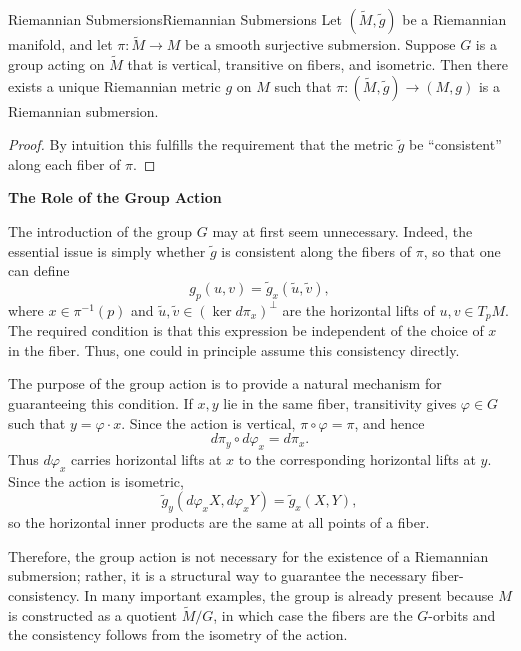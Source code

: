 \documentclass[../main.tex]{subfiles}
\begin{document}
\begin{theorem}{Riemannian Submersions}{Riemannian Submersions}
	Let $(\tilde{M}, \tilde{g})$ be a Riemannian manifold, and let $\pi: \tilde{M} \to M$ be a smooth surjective submersion. Suppose $G$ is a group acting on $\tilde{M}$ that is vertical, transitive on fibers, and isometric. Then there exists a unique Riemannian metric $g$ on $M$ such that $\pi: (\tilde{M}, \tilde{g}) \to (M, g)$ is a Riemannian submersion.
\end{theorem}
\begin{proof}
	By intuition this fulfills the requirement that the metric $\tilde{g}$ be ``consistent'' along each fiber of $\pi$.
\end{proof}

\begin{remark}
	\textbf{The Role of the Group Action}

	The introduction of the group $G$ may at first seem unnecessary. Indeed, the essential issue is simply whether $\tilde g$ is consistent along the fibers of $\pi$, so that one can define
	\begin{equation*}
		g_p(u,v)=\tilde g_x(\tilde u,\tilde v),
	\end{equation*}
	where $x\in\pi^{-1}(p)$ and $\tilde u,\tilde v\in(\ker d\pi_x)^\perp$ are the horizontal lifts of $u,v\in T_pM$. The required condition is that this expression be independent of the choice of $x$ in the fiber. Thus, one could in principle assume this consistency directly.

	The purpose of the group action is to provide a natural mechanism for guaranteeing this condition. If $x,y$ lie in the same fiber, transitivity gives $\varphi\in G$ such that $y=\varphi\cdot x$. Since the action is vertical, $\pi\circ\varphi=\pi$, and hence
	\begin{equation*}
		d\pi_y\circ d\varphi_x=d\pi_x.
	\end{equation*}
	Thus $d\varphi_x$ carries horizontal lifts at $x$ to the corresponding horizontal lifts at $y$. Since the action is isometric,
	\begin{equation*}
		\tilde g_y(d\varphi_xX,d\varphi_xY)=\tilde g_x(X,Y),
	\end{equation*}
	so the horizontal inner products are the same at all points of a fiber.

	Therefore, the group action is not necessary for the existence of a Riemannian submersion; rather, it is a structural way to guarantee the necessary fiber-consistency. In many important examples, the group is already present because $M$ is constructed as a quotient $\tilde M/G$, in which case the fibers are the $G$-orbits and the consistency follows from the isometry of the action.
\end{remark}
\end{document}
